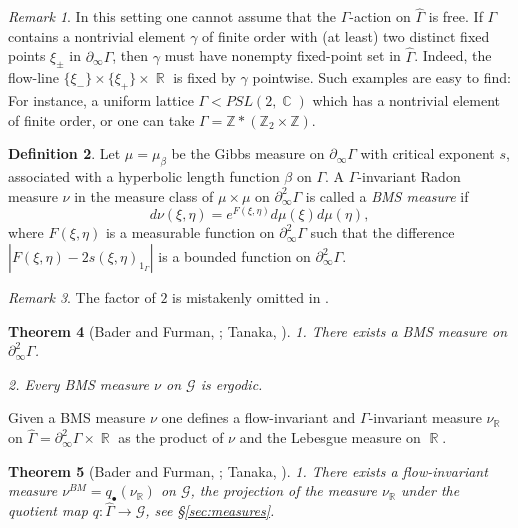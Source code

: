 \documentclass[12pt]{amsbook}%
\newtheorem{thm}{Theorem}[chapter]
\theoremstyle{definition}
\newtheorem{defi}[thm]{Definition}
\theoremstyle{remark}
\newtheorem{rem}[thm]{Remark}
\numberwithin{section}{chapter}
\numberwithin{subsection}{section}
\numberwithin{figure}{chapter}
\DeclareMathOperator{\C}{\mathbb{C}}
\DeclareMathOperator{\R}{\mathbb{R}}
\def\bZ{{\mathbb{Z}}}
\def\Ga{\Gamma}
\def\ga{\gamma}
\def\geo{\partial_\infty}
\def\cG{{\mathscr{G}}}
\begin{document}
{{\begin{rem}
In this setting one cannot assume that the $\Ga$-action on $\widehat\Ga$ is free. If $\Ga$ contains a nontrivial element $\ga$ of finite order with (at least) two distinct fixed points $\xi_\pm$ in $\geo \Ga$, then $\ga$ must have nonempty fixed-point set in $\widehat\Ga$. Indeed, the flow-line $\{\xi_-\}\times \{\xi_+\}\times \R$ is fixed by $\ga$ pointwise. Such examples are easy to find: For instance, a uniform lattice $\Ga< PSL(2,\C)$  which has a nontrivial element of finite order, or one can take 
$\Ga=\bZ * (\bZ_2\times \bZ)$.  
\end{rem}



\begin{defi}
Let $\mu=\mu_{\beta}$ be the Gibbs measure on $\geo\Ga$ with critical exponent $s$, associated with a hyperbolic length function $\beta$ on $\Ga$. 
A $\Ga$-invariant Radon measure $\nu$ in the %
measure class of $\mu\times \mu$ on $\geo^2 \Ga$ is called a {\em BMS measure} if 
$$d\nu(\xi, \eta) = e^{F(\xi,\eta)} d\mu(\xi) d\mu(\eta),$$
where $F(\xi,\eta)$ is a measurable function on $\geo^2\Ga$ such that the difference $|F(\xi,\eta)- 2s(\xi,\eta)_{1_\Ga}|$ is a bounded function on 
$\geo^2\Ga$.  
\end{defi}

\begin{rem}
The factor of $2$ is mistakenly omitted in \cite{BF}. 
\end{rem}

\begin{thm}
[Bader and Furman, \cite{BF}; Tanaka, \cite{Tanaka}] 1. There exists a BMS measure on $\geo^2\Ga$. 

2. Every BMS measure $\nu$ on $\cG$ is ergodic. 
\end{thm}


Given a BMS measure $\nu$ one defines a flow-invariant and $\Ga$-invariant measure $\nu_{\R}$ on $\widehat \Ga=\geo^2\Ga\times \R$ 
as the product of $\nu$ and the Lebesgue measure on $\R$. 

\begin{thm}
[Bader and Furman, \cite{BF}; Tanaka, \cite{Tanaka}]  
1. There exists a flow-invariant measure $\nu^{BM}=q_\bullet(\nu_{\R})$ 
on $\cG$, the projection of  the measure  $\nu_{\R}$ under the 
quotient map $q: \widehat\Ga\to \cG$, see \S \ref{sec:measures}. 


\end{thm}}}
\end{document}
